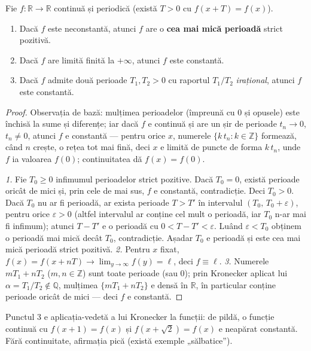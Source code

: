 \begin{propozitie}
Fie $f:\mathbb{R}\to\mathbb{R}$ continuă și periodică (există $T>0$ cu $f(x+T)=f(x)$).
\begin{enumerate}[leftmargin=*, itemsep=1pt]
\item Dacă $f$ este neconstantă, atunci $f$ are o \textbf{cea mai mică perioadă} strict pozitivă.
\item Dacă $f$ are limită finită la $+\infty$, atunci $f$ este constantă.
\item Dacă $f$ admite două perioade $T_1,T_2>0$ cu raportul $T_1/T_2$ \emph{irațional}, atunci $f$ este constantă.
\end{enumerate}
\end{propozitie}
\begin{proof}
Observația de bază: mulțimea perioadelor (împreună cu $0$ și opusele) este închisă la sume și diferențe; iar dacă $f$ e continuă și are un șir de perioade $t_n\to0$, $t_n\neq 0$, atunci $f$ e constantă --- pentru orice $x$, numerele $\{k\,t_n:k\in\mathbb{Z}\}$ formează, când $n$ crește, o rețea tot mai fină, deci $x$ e limită de puncte de forma $k\,t_n$, unde $f$ ia valoarea $f(0)$; continuitatea dă $f(x)=f(0)$.

\emph{1.} Fie $T_0\ge0$ infimumul perioadelor strict pozitive. Dacă $T_0=0$, există perioade oricât de mici și, prin cele de mai sus, $f$ e constantă, contradicție. Deci $T_0>0$. Dacă $T_0$ nu ar fi perioadă, ar exista perioade $T>T'$ în intervalul $(T_0,\,T_0+\varepsilon)$, pentru orice $\varepsilon>0$ (altfel intervalul ar conține cel mult o perioadă, iar $T_0$ n-ar mai fi infimum); atunci $T-T'$ e o perioadă cu $0<T-T'<\varepsilon$. Luând $\varepsilon<T_0$ obținem o perioadă mai mică decât $T_0$, contradicție. Așadar $T_0$ e perioadă și este cea mai mică perioadă strict pozitivă.
\emph{2.} Pentru $x$ fixat, $f(x)=f(x+nT)\to\lim_{y\to\infty}f(y)=\ell$, deci $f\equiv\ell$.
\emph{3.} Numerele $mT_1+nT_2$ ($m,n\in\mathbb{Z}$) sunt toate perioade (sau $0$); prin Kronecker aplicat lui $\alpha=T_1/T_2\notin\mathbb{Q}$, mulțimea $\{mT_1+nT_2\}$ e densă în $\mathbb{R}$, în particular conține perioade oricât de mici --- deci $f$ e constantă.
\end{proof}

\begin{obs}
Punctul 3 e aplicația-vedetă a lui Kronecker la funcții: de pildă, o funcție continuă cu $f(x+1)=f(x)$ și $f(x+\sqrt2)=f(x)$ e neapărat constantă. Fără continuitate, afirmația pică (există exemple „sălbatice'').
\end{obs}


